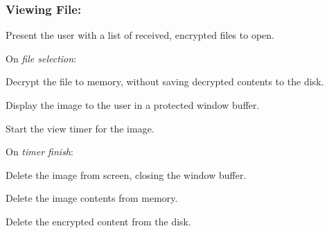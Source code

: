 \documentclass[11pt, a4paper,titlepage]{report}
\begin{document}
\subsubsection{Viewing File:}
\begin{itemize*}
	\item Present the user with a list of received, encrypted files to open.
	\begin{itemize*}
		\item[] On \emph{file selection}:
		\begin{itemize*}
			\item Decrypt the file to memory, without saving decrypted contents to the disk.
			\item Display the image to the user in a protected window buffer.
			\item Start the view timer for the image.
		\end{itemize*}
		\item[] On \emph{timer finish}:
		\begin{itemize*}
			\item Delete the image from screen, closing the window buffer.
			\item Delete the image contents from memory.
			\item Delete the encrypted content from the disk.
		\end{itemize*}
	\end{itemize*}
\end{itemize*}
\end{document}
